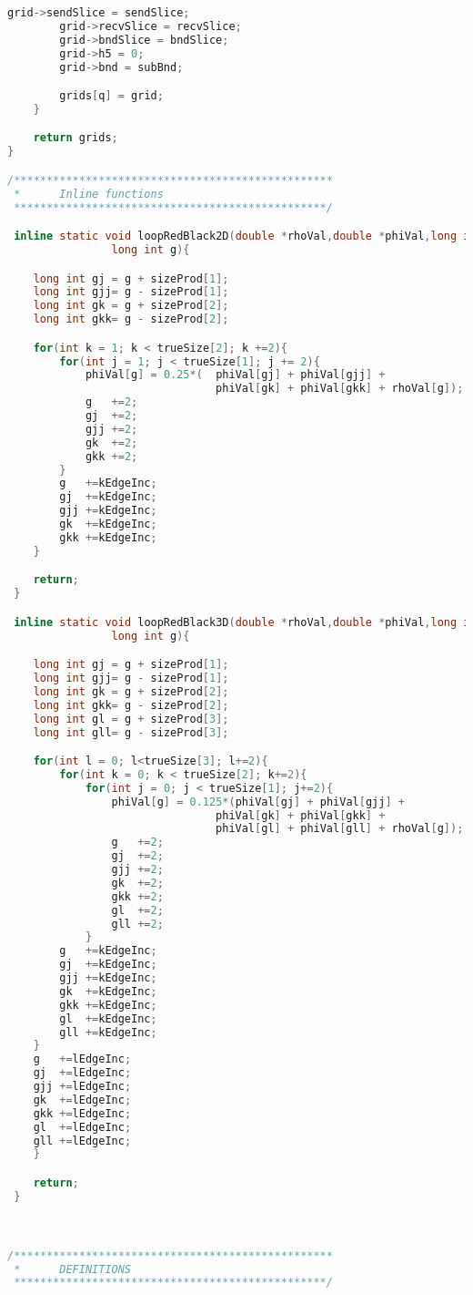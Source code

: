 \begin{lstlisting}[language=c, caption = main routine]
		grid->sendSlice = sendSlice;
		grid->recvSlice = recvSlice;
		grid->bndSlice = bndSlice;
		grid->h5 = 0;
		grid->bnd = subBnd;

		grids[q] = grid;
	}

	return grids;
}

/*************************************************
 *		Inline functions
 ************************************************/

 inline static void loopRedBlack2D(double *rhoVal,double *phiVal,long int *sizeProd, int *trueSize, int kEdgeInc,
 				long int g){

 	long int gj = g + sizeProd[1];
 	long int gjj= g - sizeProd[1];
 	long int gk = g + sizeProd[2];
 	long int gkk= g - sizeProd[2];

 	for(int k = 1; k < trueSize[2]; k +=2){
 		for(int j = 1; j < trueSize[1]; j += 2){
 			phiVal[g] = 0.25*(	phiVal[gj] + phiVal[gjj] +
 								phiVal[gk] + phiVal[gkk] + rhoVal[g]);
 			g	+=2;
 			gj	+=2;
 			gjj	+=2;
 			gk	+=2;
 			gkk	+=2;
 		}
 		g	+=kEdgeInc;
 		gj	+=kEdgeInc;
 		gjj	+=kEdgeInc;
 		gk	+=kEdgeInc;
 		gkk	+=kEdgeInc;
 	}

 	return;
 }

 inline static void loopRedBlack3D(double *rhoVal,double *phiVal,long int *sizeProd, int *trueSize, int kEdgeInc, int lEdgeInc,
 				long int g){

 	long int gj = g + sizeProd[1];
 	long int gjj= g - sizeProd[1];
 	long int gk = g + sizeProd[2];
 	long int gkk= g - sizeProd[2];
 	long int gl = g + sizeProd[3];
 	long int gll= g - sizeProd[3];

 	for(int l = 0; l<trueSize[3]; l+=2){
 		for(int k = 0; k < trueSize[2]; k+=2){
 			for(int j = 0; j < trueSize[1]; j+=2){
 				phiVal[g] = 0.125*(phiVal[gj] + phiVal[gjj] +
 								phiVal[gk] + phiVal[gkk] +
 								phiVal[gl] + phiVal[gll] + rhoVal[g]);
 				g	+=2;
 				gj	+=2;
 				gjj	+=2;
 				gk	+=2;
 				gkk	+=2;
 				gl	+=2;
 				gll	+=2;
 			}
 		g	+=kEdgeInc;
 		gj	+=kEdgeInc;
 		gjj	+=kEdgeInc;
 		gk	+=kEdgeInc;
 		gkk	+=kEdgeInc;
 		gl	+=kEdgeInc;
 		gll	+=kEdgeInc;
	}
 	g	+=lEdgeInc;
 	gj	+=lEdgeInc;
 	gjj	+=lEdgeInc;
 	gk	+=lEdgeInc;
 	gkk	+=lEdgeInc;
 	gl	+=lEdgeInc;
 	gll	+=lEdgeInc;
 	}

 	return;
 }



/*************************************************
 *		DEFINITIONS
 ************************************************/




\end{lstlisting}
